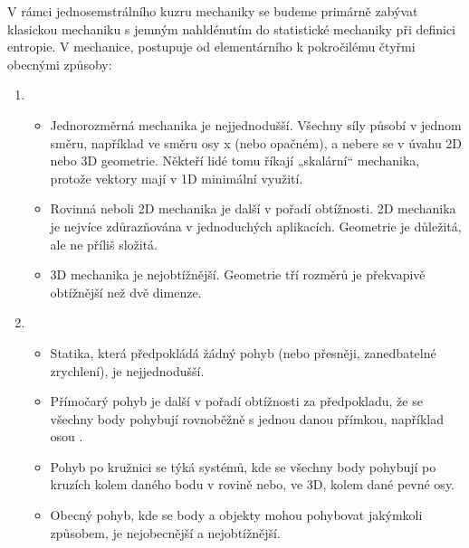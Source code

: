 \documentclass[letterpaper,10pt,english]{jupyterBook}
\begin{document}
\sphinxAtStartPar
V rámci jednosemstrálního kuzru mechaniky se budeme primárně zabývat klasickou mechaniku s jemným nahldénutím do statistické mechaniky při definici entropie. V mechanice, postupuje od elementárního k pokročilému čtyřmi obecnými způsoby:
\begin{enumerate}
%
\item {} 
\sphinxAtStartPar
{}
\begin{itemize}
\item {} 
\sphinxAtStartPar
Jednorozměrná mechanika je nejjednodušší. Všechny síly působí v jednom směru, například ve směru osy x (nebo opačném), a nebere se v úvahu 2D nebo 3D geometrie. Někteří lidé tomu říkají „skalární“ mechanika, protože vektory mají v 1D minimální využití.

\item {} 
\sphinxAtStartPar
Rovinná neboli 2D mechanika je další v pořadí obtížnosti. 2D mechanika je nejvíce zdůrazňována v jednoduchých aplikacích. Geometrie je důležitá, ale ne příliš složitá.

\item {} 
\sphinxAtStartPar
3D mechanika je nejobtížnější. Geometrie tří rozměrů je překvapivě obtížnější než dvě dimenze.

\end{itemize}

\item {} 
\sphinxAtStartPar
{}
\begin{itemize}
\item {} 
\sphinxAtStartPar
Statika, která předpokládá žádný pohyb (nebo přesněji, zanedbatelné zrychlení), je nejjednodušší.

\item {} 
\sphinxAtStartPar
Přímočarý pohyb je další v pořadí obtížnosti za předpokladu, že se všechny body pohybují rovnoběžně s jednou danou přímkou, například osou .

\item {} 
\sphinxAtStartPar
Pohyb po kružnici se týká systémů, kde se všechny body pohybují po kruzích kolem daného bodu v rovině nebo, ve 3D, kolem dané pevné osy.

\item {} 
\sphinxAtStartPar
Obecný pohyb, kde se body a objekty mohou pohybovat jakýmkoli způsobem, je nejobecnější a nejobtížnější.

\end{itemize}


\end{enumerate}
\end{document}
